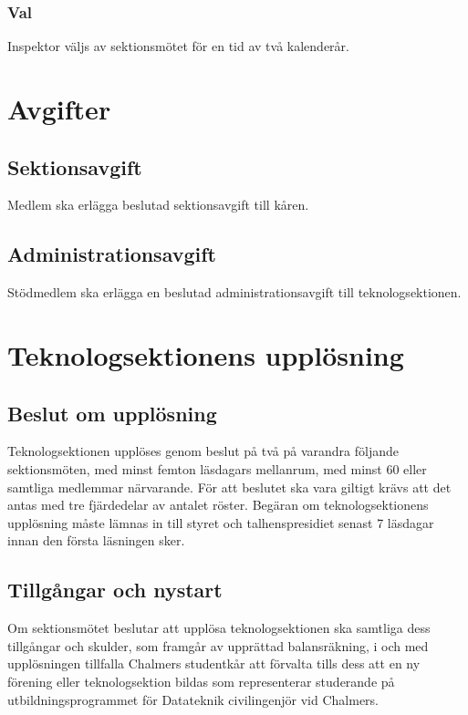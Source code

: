 \documentclass[a4paper]{dtek}
\begin{document}
\subsubsection{Val}
Inspektor väljs av sektionsmötet för en tid av två kalenderår.
\newpage

\section{Avgifter}
\subsection{Sektionsavgift}
Medlem ska erlägga beslutad sektionsavgift till kåren.
\subsection{Administrationsavgift}
Stödmedlem ska erlägga en beslutad administrationsavgift till teknologsektionen.
\newpage

\section{Teknologsektionens upplösning}
\subsection{Beslut om upplösning}
Teknologsektionen upplöses genom beslut på två på varandra följande sektionsmöten, med minst femton läsdagars mellanrum, med minst 60 eller samtliga medlemmar närvarande.
För att beslutet ska vara giltigt krävs att det antas med tre fjärdedelar av antalet röster.
Begäran om teknologsektionens upplösning måste lämnas in till styret och talhenspresidiet senast 7 läsdagar innan den första läsningen sker.
\subsection{Tillgångar och nystart}
Om sektionsmötet beslutar att upplösa teknologsektionen ska samtliga dess tillgångar och skulder, som framgår av upprättad balansräkning, i och med upplösningen tillfalla Chalmers studentkår att förvalta tills dess att en ny förening eller teknologsektion bildas som representerar studerande på utbildningsprogrammet för Datateknik civilingenjör vid Chalmers.
\newpage

\end{document}
